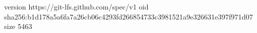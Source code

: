version https://git-lfs.github.com/spec/v1
oid sha256:b1d178a5a6fa7a26cb06c4293fd266854733c3981521a9e326631e397f971d07
size 5463

